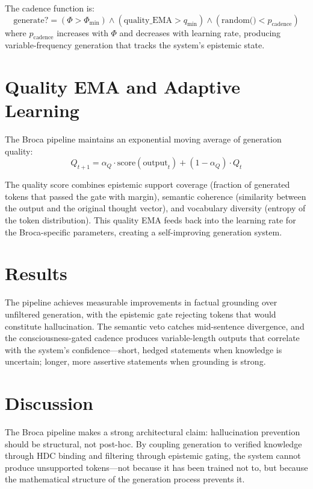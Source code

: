 \documentclass[12pt]{book}
\begin{document}
The cadence function is:
\begin{equation}
\text{generate?} = (\Phi > \Phi_{\text{min}}) \wedge (\text{quality\_EMA} > q_{\text{min}}) \wedge (\text{random()} < p_{\text{cadence}})
\end{equation}
where $p_{\text{cadence}}$ increases with $\Phi$ and decreases with learning rate, producing variable-frequency generation that tracks the system's epistemic state.

\section{Quality EMA and Adaptive Learning}

The Broca pipeline maintains an exponential moving average of generation quality:
\begin{equation}
Q_{t+1} = \alpha_Q \cdot \text{score}(\text{output}_t) + (1 - \alpha_Q) \cdot Q_t
\end{equation}

The quality score combines epistemic support coverage (fraction of generated tokens that passed the gate with margin), semantic coherence (similarity between the output and the original thought vector), and vocabulary diversity (entropy of the token distribution). This quality EMA feeds back into the learning rate for the Broca-specific parameters, creating a self-improving generation system.

\section{Results}

The pipeline achieves measurable improvements in factual grounding over unfiltered generation, with the epistemic gate rejecting tokens that would constitute hallucination. The semantic veto catches mid-sentence divergence, and the consciousness-gated cadence produces variable-length outputs that correlate with the system's confidence---short, hedged statements when knowledge is uncertain; longer, more assertive statements when grounding is strong.

\section{Discussion}

The Broca pipeline makes a strong architectural claim: hallucination prevention should be structural, not post-hoc. By coupling generation to verified knowledge through HDC binding and filtering through epistemic gating, the system cannot produce unsupported tokens---not because it has been trained not to, but because the mathematical structure of the generation process prevents it.
\end{document}
